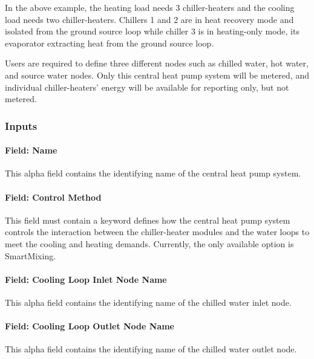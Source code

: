 In the above example, the heating load needs 3 chiller-heaters and the cooling load needs two chiller-heaters. Chillers 1 and 2 are in heat recovery mode and isolated from the ground source loop while chiller 3 is in heating-only mode, its evaporator extracting heat from the ground source loop.

Users are required to define three different nodes such as chilled water, hot water, and source water nodes. Only this central heat pump system will be metered, and individual chiller-heaters' energy will be available for reporting only, but not metered.

\subsubsection{Inputs}\label{inputs-19-004}

\paragraph{Field: Name}\label{field-name-18-005}

This alpha field contains the identifying name of the central heat pump system.

\paragraph{Field: Control Method}\label{field-control-method}

This field must contain a keyword defines how the central heat pump system controls the interaction between the chiller-heater modules and the water loops to meet the cooling and heating demands. Currently, the only available option is SmartMixing.

\paragraph{Field: Cooling Loop Inlet Node Name}\label{field-cooling-loop-inlet-node-name}

This alpha field contains the identifying name of the chilled water inlet node.

\paragraph{Field: Cooling Loop Outlet Node Name}\label{field-cooling-loop-outlet-node-name}

This alpha field contains the identifying name of the chilled water outlet node.

